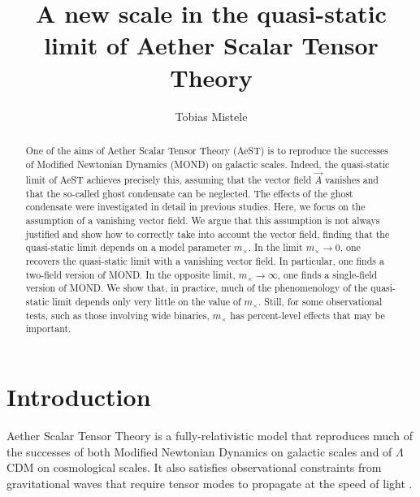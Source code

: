 \documentclass[reprint, amsmath,amssymb, nofootinbib, aps, prd]{revtex4-2}
\begin{document}
\title{A new scale in the quasi-static limit of Aether Scalar Tensor Theory}

\author{Tobias Mistele}%

\begin{abstract}
One of the aims of Aether Scalar Tensor Theory (AeST) is to reproduce the successes of Modified Newtonian Dynamics (MOND) on galactic scales.
Indeed, the quasi-static limit of AeST achieves precisely this, assuming that the vector field $\vec{A}$ vanishes and that the so-called ghost condensate can be neglected.
The effects of the ghost condensate were investigated in detail in previous studies.
Here, we focus on the assumption of a vanishing vector field.
We argue that this assumption is not always justified and show how to correctly take into account the vector field, finding that the quasi-static limit depends on a model parameter $m_\times$.
In the limit $m_\times \to 0$, one recovers the quasi-static limit with a vanishing vector field.
In particular, one finds a two-field version of MOND.
In the opposite limit, $m_\times \to \infty$, one finds a single-field version of MOND.
We show that, in practice, much of the phenomenology of the quasi-static limit depends only very little on the value of $m_\times$.
Still, for some observational tests, such as those involving wide binaries, $m_\times$ has percent-level effects that may be important.
\end{abstract}

\maketitle

\section{Introduction}
\label{sec:introduction}

Aether Scalar Tensor Theory \citep[AeST,][]{Skordis2020, Skordis2021} is a fully-relativistic model that reproduces much of the successes of both  Modified Newtonian Dynamics \citep[MOND,][]{Milgrom1983a, Milgrom1983b, Milgrom1983c} on galactic scales and of $\Lambda$CDM on cosmological scales.
It also satisfies observational constraints from gravitational waves that require tensor modes to propagate at the speed of light \citep{Sanders2018, Boran2018}.
\end{document}

